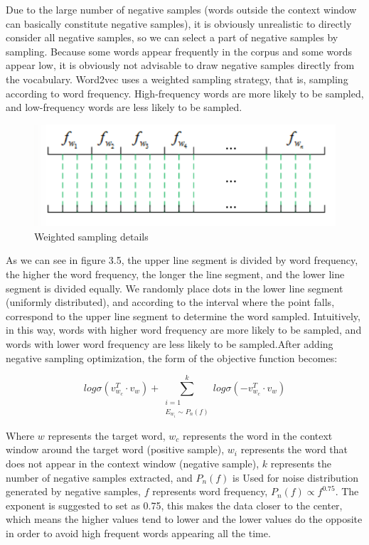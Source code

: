 \noindent Due to the large number of negative samples (words outside the context window can basically constitute negative samples), it is obviously unrealistic to directly consider all negative samples, so we can select a part of negative samples by sampling. Because some words appear frequently in the corpus and some words appear low, it is obviously not advisable to draw negative samples directly from the vocabulary. Word2vec uses a weighted sampling strategy, that is, sampling according to word frequency. High-frequency words are more likely to be sampled, and low-frequency words are less likely to be sampled.\\

\begin{figure}[ht]

\centering
\includegraphics[scale=1.3]{images/image_largevis_word2vec_seperate_lines.PNG}
\caption{Weighted sampling details}
\label{fig:label}
\end{figure}

\noindent As we can see in figure 3.5, the upper line segment is divided by word frequency, the higher the word frequency, the longer the line segment, and the lower line segment is divided equally. We randomly place dots in the lower line segment (uniformly distributed), and according to the interval where the point falls, correspond to the upper line segment to determine the word sampled. Intuitively, in this way, words with higher word frequency are more likely to be sampled, and words with lower word frequency are less likely to be sampled.After adding negative sampling optimization, the form of the objective function becomes:

\begin{equation*}
    {log \sigma(v_{w_c}^T \cdot v_w)} + {\sum^k_{\substack{i=1\\ {E_{w_i} \sim P_n(f)}}}log \sigma(-v_{w_c}^T \cdot v_w)}
\end{equation*}

\noindent Where $w$ represents the target word, $w_c$ represents the word in the context window around the target word (positive sample), $w_i$ represents the word that does not appear in the context window (negative sample), $k$ represents the number of negative samples extracted, and $P_n(f)$ is Used for noise distribution generated by negative samples, $f$ represents word frequency, $P_n(f)∝f^{0.75}$. The exponent is suggested to set as 0.75\cite{ref7}, this makes the data closer to the center, which means the higher values tend to lower and the lower values do the opposite in order to avoid high frequent words appearing all the time. 

